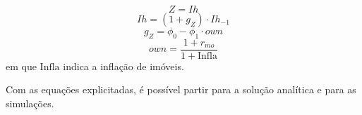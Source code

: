 \begin{equation}
\label{_Z}
    Z = Ih
\end{equation}
\begin{equation}
    Ih = (1 + g_Z)\cdot Ih_{-1}
\end{equation}
\begin{equation}
g_Z = \phi_0 - \phi_1\cdot own
\end{equation}
\begin{equation}
own = \frac{1+r_{mo}}{1+\text{Infla}}
\end{equation}
em que $\text{Infla}$ indica a inflação de imóveis. 
\begin{comment}
Adicionalmente, seguindo a exposição de \textcite{leamer_housing_2007}, o estoque de imóveis determina o acesso ao crédito com certa defasagem $\tau$ de modo que:
\begin{equation}
N = \Theta\cdot \Delta Khn_{-\tau}\cdot p_{h_{-\tau}}
\end{equation}
com $\Theta$ representando um parâmetro e $Khn$ sendo o estoque de imóveis nominal. 
\end{comment}
Com as equações explicitadas, é possível partir para a solução analítica e para as simulações. 